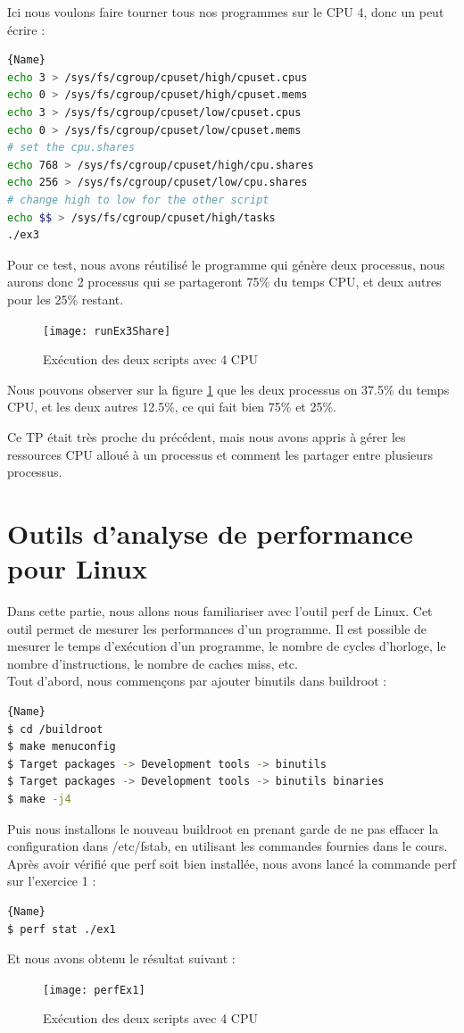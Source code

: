 \documentclass[
	a4paper, %
	10pt, %
]{CSUniSchoolLabReport}
\begin{document}
\begin{enumerate}[label=\textbf{\arabic*}]
Ici nous voulons faire tourner tous nos programmes sur le CPU 4, donc un peut \'ecrire :
\begin{lstlisting}[language=bash, firstnumber=1]{Name}
echo 3 > /sys/fs/cgroup/cpuset/high/cpuset.cpus
echo 0 > /sys/fs/cgroup/cpuset/high/cpuset.mems
echo 3 > /sys/fs/cgroup/cpuset/low/cpuset.cpus
echo 0 > /sys/fs/cgroup/cpuset/low/cpuset.mems
# set the cpu.shares
echo 768 > /sys/fs/cgroup/cpuset/high/cpu.shares
echo 256 > /sys/fs/cgroup/cpuset/low/cpu.shares
# change high to low for the other script
echo $$ > /sys/fs/cgroup/cpuset/high/tasks 
./ex3
\end{lstlisting}
Pour ce test, nous avons réutilis\'e le programme qui g\'en\`ere deux processus, nous aurons donc 2 processus qui se partageront 75\% du temps CPU, et deux autres pour les 25\% restant.
\begin{figure}[H]
	\centering
	\texttt{[image: runEx3Share]}
	\caption{Ex\'ecution des deux scripts avec 4 CPU}
	\label{fig:runEx3Share}
\end{figure}
Nous pouvons observer sur la figure \ref{fig:runEx3Share} que les deux processus on 37.5\% du temps CPU, et les deux autres 12.5\%, ce qui fait bien 75\% et 25\%.

Ce TP était tr\`es proche du pr\'ec\'edent, mais nous avons appris à g\'erer les ressources CPU alloué à un processus et comment les partager entre plusieurs processus.
\end{enumerate}


\section{Outils d'analyse de performance pour Linux}
Dans cette partie, nous allons nous familiariser avec l'outil perf de Linux. Cet outil permet de mesurer les performances d'un programme. Il est possible de mesurer le temps d'ex\'ecution d'un programme, le nombre de cycles d'horloge, le nombre d'instructions, le nombre de caches miss, etc.\\

Tout d'abord, nous commen\c{c}ons par ajouter binutils dans buildroot :
\begin{lstlisting}[language=bash, firstnumber=1]{Name}
$ cd /buildroot
$ make menuconfig
$ Target packages -> Development tools -> binutils
$ Target packages -> Development tools -> binutils binaries
$ make -j4
\end{lstlisting}

Puis nous installons le nouveau buildroot en prenant garde de ne pas effacer la configuration dans /etc/fstab, en utilisant les commandes fournies dans le cours.
Apr\`es avoir v\'erifié que perf soit bien installée, nous avons lancé la commande perf sur l'exercice 1 :
\begin{lstlisting}[language=bash, firstnumber=1]{Name}
$ perf stat ./ex1
\end{lstlisting}
Et nous avons obtenu le r\'esultat suivant :
\begin{figure}[H]
	\centering
	\texttt{[image: perfEx1]}
	\caption{Ex\'ecution des deux scripts avec 4 CPU}
	\label{fig:perfEx1}
\end{figure}
\end{document}
